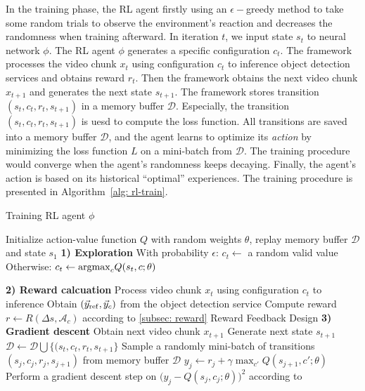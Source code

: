 In the training phase, the RL agent firstly using an $\epsilon-$greedy method to take some random trials to observe the environment's reaction and decreases the randomness when training afterward. In iteration $t$, we input state $s_t $ to neural network $ \phi $. The RL agent $\phi$ generates a specific configuration $c_t$. The framework processes the video chunk $x_t$ using configuration $c_t$ to inference object detection services and obtains reward $r_t$. Then the framework obtains the next video chunk $x_{t+1}$ and generates the next state $ s_{t+1} $. The framework stores transition $(s_t, c_t, r_t, s_{t+1})$ in a memory buffer $\mathcal{D}$. Especially, the transition $(s_t, c_t, r_t, s_{t+1} )$ is uesd to compute the loss function. All transitions are saved into a memory buffer $ \mathcal{D} $, and the agent learns to optimize its \emph{action} by minimizing the loss function $ L $ on a mini-batch from $ \mathcal{D} $. The training procedure would converge when the agent's randomness keeps decaying. Finally, the agent's action is based on its historical ``optimal'' experiences. The training procedure is presented in Algorithm~\ref{alg: rl-train}.

\begin{algorithm}[!t]
		\caption{Training RL agent $ \phi $} %
		\label{alg: rl-train}
		\begin{algorithmic}[1]	
			\STATE Initialize action-value function $ Q $ with random weights $ \theta $, replay memory buffer $ \mathcal{D} $ and state $ s_1 $				
			\STATE \textbf{1) Exploration}
			\STATE With probability $\epsilon$:
			\STATE \hspace{1em} $c_t \leftarrow$ a random valid value 
			\STATE Otherwise:
			\STATE \hspace{1em} $ c_t \leftarrow {\rm argmax}_cQ(s_t, c; \theta) $ 

			\STATE \textbf{2) Reward calcuation} 
			\STATE Process video chunk $ x_t $ using configuration $ c_t $ to inference
			\STATE Obtain $ (\vec{y}_{\rm ref}, \vec{y}_c) $ from the object detection service
			\STATE Compute reward $ r \leftarrow R(\Delta s, \mathcal{A}_c) $ according to \ref{subsec: reward} Reward Feedback Design 
			\STATE \textbf{3) Gradient descent}
			\STATE Obtain next video chunk $ x_{t+1} $
			\STATE Generate next state $ s_{t+1} $
			\STATE $ \mathcal{D} \leftarrow \mathcal{D} \bigcup \{(s_t, c_t, r_t, s_{t+1} \} $
			\STATE Sample a randomly mini-batch of transitions $ (s_j, c_j, r_j, s_{j+1}) $ from memory buffer $ \mathcal{D} $
			\STATE $ y_j \leftarrow r_j + \gamma \max_{c'}Q(s_{j+1}, c'; \theta) $
			\STATE Perform a gradient descent step on $ \big(y_j - Q(s_j, c_j; \theta)\big)^2 $ according to~\cite{DQN}
			\ENDFOR
		\end{algorithmic}
\end{algorithm}

